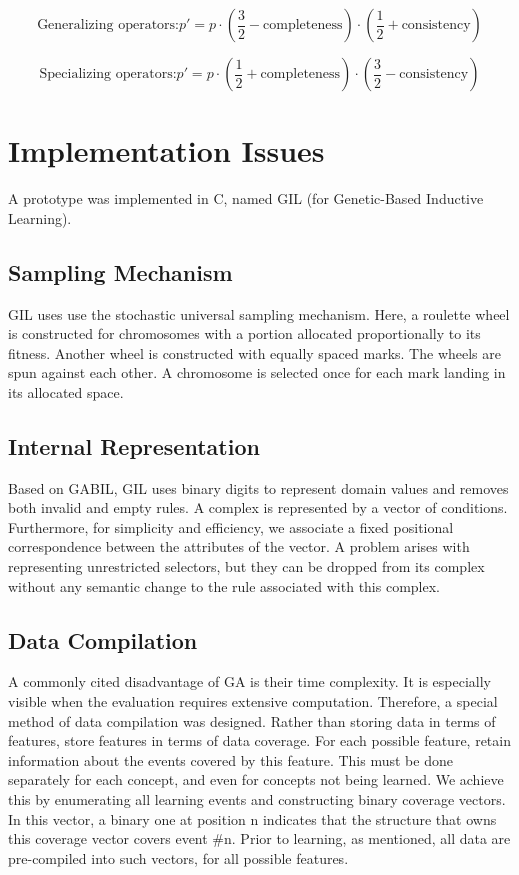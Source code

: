\documentclass[../main.tex]{subfiles}
\begin{document}
\begin{equation}
	\text{Generalizing operators:} p' = p \cdot \left( \frac{3}{2} - \text{completeness} \right) \cdot \left(
	\frac{1}{2} + \text{consistency} \right)
\end{equation}

\begin{equation}
	\text{Specializing operators:} p' = p \cdot \left( \frac{1}{2} + \text{completeness} \right) \cdot \left(
	\frac{3}{2} - \text{consistency} \right)
\end{equation}

\section{Implementation Issues}

A prototype was implemented in C, named GIL (for Genetic-Based Inductive Learning).

\subsection{Sampling Mechanism}

GIL uses use the stochastic universal sampling mechanism. Here, a roulette wheel is constructed for chromosomes with a
portion allocated proportionally to its fitness. Another wheel is constructed with equally spaced marks. The wheels are
spun against each other. A chromosome is selected once for each mark landing in its allocated space.

\subsection{Internal Representation}

Based on GABIL, GIL uses  binary digits to represent domain values and removes both invalid and empty rules. A complex
is represented by a vector of conditions. Furthermore, for simplicity and efficiency, we associate a fixed positional
correspondence between the attributes of the vector. A problem arises with representing unrestricted selectors, but
they can be dropped from its complex without any semantic change to the rule associated with this complex.

\subsection{Data Compilation}
A commonly cited disadvantage of GA is their time complexity. It is especially visible when the evaluation requires
extensive computation. Therefore, a special method of data compilation was designed. Rather than storing data in terms
of features, store features in terms of data coverage. For each possible feature, retain information about the events
covered by this feature. This must be done separately for each concept, and even for concepts not being learned. We
achieve this by enumerating all learning events and constructing binary coverage vectors. In this vector, a binary one
at position n indicates that the structure that owns this coverage vector covers event \#n. Prior to learning, as
mentioned, all data are pre-compiled into such vectors, for all possible features.
\end{document}
